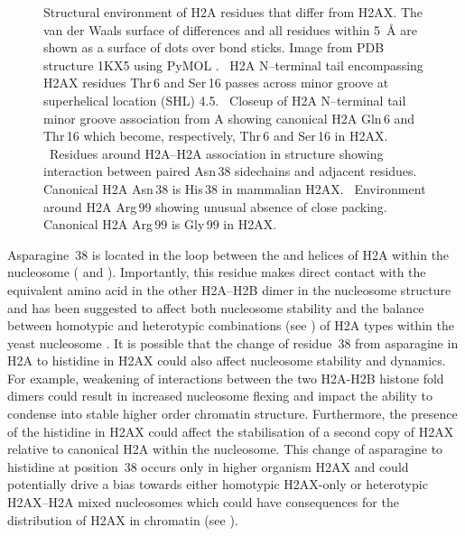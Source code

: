 \begin{figure}
\caption[Structural environment of H2A residues that differ from H2AX]%
        {Structural environment of H2A residues that differ from
          H2AX\@. The van der Waals surface of differences and all
          residues within \SI{5}{\angstrom} are shown as a surface of
          dots over bond sticks. Image from PDB structure 1KX5 using
          PyMOL \citep{DeL02}.
          ~H2A N--terminal
          tail encompassing H2AX residues Thr\,6 and Ser\,16 passes
          across minor groove at superhelical location (SHL) 4.5\@.
          ~Closeup of H2A
          N--terminal tail minor groove association from A showing
          canonical H2A Gln\,6 and Thr\,16 which become, respectively,
          Thr\,6 and Ser\,16 in H2AX\@.
          ~Residues around
          H2A--H2A association in structure showing interaction
          between paired Asn\,38 sidechains and adjacent
          residues. Canonical H2A Asn\,38 is His\,38 in mammalian
          H2AX\@.
          ~Environment around
          H2A Arg\,99 showing unusual absence of close packing.
          Canonical H2A Arg\,99 is Gly\,99 in H2AX.}
\label{fig:h2ax-review:framed}
\end{figure}

Asparagine~38 is located in the loop between the  and
 helices of H2A within the nucleosome
( and
). Importantly, this residue makes
direct contact with the equivalent amino acid in the other H2A--H2B
dimer in the nucleosome structure and has been suggested to affect
both nucleosome stability and the balance between homotypic and
heterotypic combinations (see
) of H2A types within the
yeast nucleosome \citep{CLW01}. It is possible that the change of
residue~38 from asparagine in H2A to histidine in H2AX could also
affect nucleosome stability and dynamics. For example, weakening of
interactions between the two H2A-H2B histone fold dimers could result
in increased nucleosome flexing and impact the ability to condense
into stable higher order chromatin structure. Furthermore, the
presence of the histidine in H2AX could affect the stabilisation of a
second copy of H2AX relative to canonical H2A within the
nucleosome. This change of asparagine to histidine at position~38
occurs only in higher organism H2AX and could potentially drive a bias
towards either homotypic H2AX-only or heterotypic H2AX--H2A mixed
nucleosomes which could have consequences for the distribution of H2AX
in chromatin (see ).


